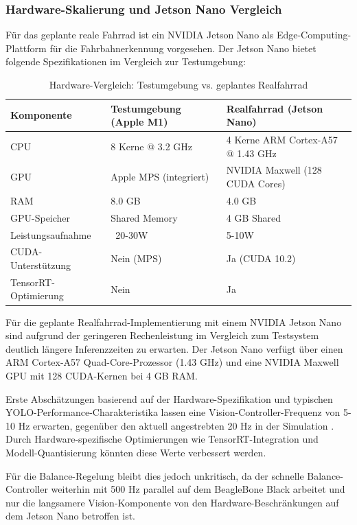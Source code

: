 \subsubsection{Hardware-Skalierung und Jetson Nano Vergleich} 


Für das geplante reale Fahrrad ist ein NVIDIA Jetson Nano als Edge-Computing-Plattform für die Fahrbahnerkennung vorgesehen. Der Jetson Nano bietet folgende Spezifikationen im Vergleich zur Testumgebung:

\begin{table}[htbp]
\centering
\caption{Hardware-Vergleich: Testumgebung vs. geplantes Realfahrrad}
\label{tab:hardware-comparison}
\begin{tabular}{lll}
\toprule
\textbf{Komponente} & \textbf{Testumgebung (Apple M1)} & \textbf{Realfahrrad (Jetson Nano)} \\
\midrule
CPU & 8 Kerne @ 3.2 GHz & 4 Kerne ARM Cortex-A57 @ 1.43 GHz \\
GPU & Apple MPS (integriert) & NVIDIA Maxwell (128 CUDA Cores) \\
RAM & 8.0 GB & 4.0 GB \\
GPU-Speicher & Shared Memory & 4 GB Shared \\
Leistungsaufnahme & ~20-30W & 5-10W \\
CUDA-Unterstützung & Nein (MPS) & Ja (CUDA 10.2) \\
TensorRT-Optimierung & Nein & Ja \\
\bottomrule
\end{tabular}
\end{table}

Für die geplante Realfahrrad-Implementierung 
mit einem NVIDIA Jetson Nano sind aufgrund der geringeren 
Rechenleistung im Vergleich zum Testsystem deutlich längere Inferenzzeiten zu erwarten. 
Der Jetson Nano verfügt über einen ARM Cortex-A57 Quad-Core-Prozessor (1.43 GHz) und 
eine NVIDIA Maxwell GPU mit 128 CUDA-Kernen bei 4 GB RAM\citep{nvidia_jetson_specs}. 

Erste Abschätzungen basierend auf der Hardware-Spezifikation und typischen 
YOLO-Performance-Charakteristika lassen eine 
Vision-Controller-Frequenz von 5-10 Hz erwarten, gegenüber den aktuell 
angestrebten 20 Hz in der Simulation \citep{yolo_edge_performance}. Durch Hardware-spezifische Optimierungen 
wie TensorRT-Integration und Modell-Quantisierung könnten diese Werte 
verbessert werden\citep{tensorrt_optimization}.

Für die Balance-Regelung bleibt dies jedoch unkritisch, da der schnelle 
Balance-Controller weiterhin mit 500 Hz parallel auf dem BeagleBone Black arbeitet und nur die langsamere
Vision-Komponente von den Hardware-Beschränkungen auf dem Jetson Nano betroffen ist.


